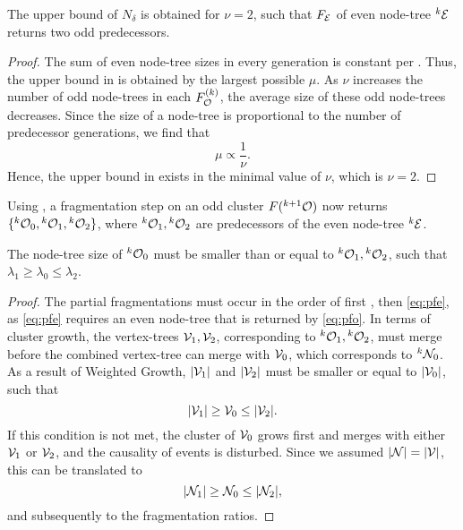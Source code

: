 \begin{theorem}\label{the:fragnumber}
  The upper bound of $N_\delta$ is obtained for $\nu=2$, such that $F_{\mathcal{E}}$ of even node-tree ${}^{k}\mathcal{E}$ returns two odd predecessors. 
\end{theorem}
\begin{proof}
  The sum of even node-tree sizes in every generation is constant per . Thus, the upper bound in  is obtained by the largest possible $\mu$. As $\nu$ increases the number of odd node-trees in each $F^{(k)}_{\mathcal{O}}$, the average size of these odd node-trees decreases. Since the size of a node-tree is proportional to the number of predecessor generations, we find that 
  \begin{equation*}
    \mu \propto \frac{1}{\nu}. 
  \end{equation*}
  Hence, the upper bound in  exists in the minimal value of $\nu$, which is $\nu = 2$.
\end{proof}

Using , a fragmentation step on an odd cluster $F({}^{k+1}\mathcal{O})$ now returns $\{{}^{k}\mathcal{O}_0, {}^{k}\mathcal{O}_1, {}^{k}\mathcal{O}_2\}$, where ${}^{k}\mathcal{O}_1, {}^{k}\mathcal{O}_2$ are predecessors of the even node-tree ${}^{k}\mathcal{E}$. 

\begin{lemma}\label{lem:chrono}
  The node-tree size of ${}^{k}\mathcal{O}_0$ must be smaller than or equal to ${}^{k}\mathcal{O}_1, {}^{k}\mathcal{O}_2$, such that $\lambda_1 \geq \lambda_0 \leq \lambda_2$. 
\end{lemma}
\begin{proof}
  The partial fragmentations must occur in the order of first , then \eqref{eq:pfe}, as \eqref{eq:pfe} requires an even node-tree that is returned by \eqref{eq:pfo}. In terms of cluster growth, the vertex-trees $\mathcal{V}_1, \mathcal{V}_2$, corresponding to ${}^{k}\mathcal{O}_1, {}^{k}\mathcal{O}_2$, must merge before the combined vertex-tree can merge with $\mathcal{V}_0$, which corresponds to ${}^{k}\mathcal{N}_0$. As a result of Weighted Growth, $\lvert\mathcal{V}_1\rvert$ and $\lvert\mathcal{V}_2\rvert$ must be smaller or equal to $\lvert\mathcal{V}_0\rvert$, such that 
  \begin{equation*}
    \lvert\mathcal{V}_1\rvert\geq \mathcal{V}_0 \leq\lvert\mathcal{V}_2\rvert.
  \end{equation*}
  If this condition is not met, the cluster of $\mathcal{V}_0$ grows first and merges with either $\mathcal{V}_1$ or $\mathcal{V}_2$, and the causality of events is disturbed. Since we assumed $\lvert\mathcal{N}\rvert=\lvert\mathcal{V}\rvert$, this can be translated to 
  \begin{equation*}
    \lvert\mathcal{N}_1\rvert\geq \mathcal{N}_0 \leq\lvert\mathcal{N}_2\rvert,
  \end{equation*}
  and subsequently to the fragmentation ratios.
\end{proof}

